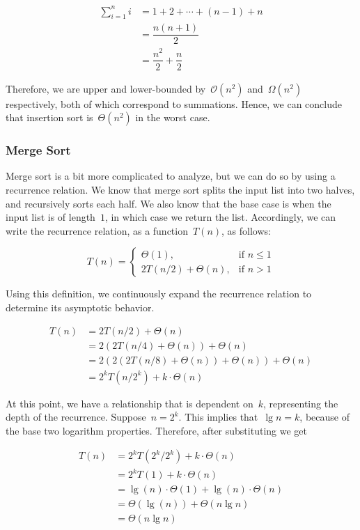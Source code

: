 \begin{align*}
  \sum_{i=1}^{n}i &= 1 + 2 + \cdots + (n - 1) + n\\
  &= \dfrac{n(n + 1)}{2}\\
  &= \dfrac{n^2}{2} + \dfrac{n}{2}
\end{align*}

Therefore, we are upper and lower-bounded by~$\mathcal{O}(n^2)$ and~$\Omega(n^2)$ respectively, both of which correspond to summations.
Hence, we can conclude that insertion sort is~$\Theta(n^2)$ in the worst case.

\subsubsection*{Merge Sort}
Merge sort is a bit more complicated to analyze, but we can do so by using a recurrence relation. 
We know that merge sort splits the input list into two halves, and recursively sorts each half. 
We also know that the base case is when the input list is of length~$1$, in which case we return the list. 
Accordingly, we can write the recurrence relation, as a function~$T(n)$, as follows:

\[
T(n)=
  \begin{cases}
    \Theta(1), & \text{if } n \leq 1\\
    2T(n/2) + \Theta(n), & \text{if } n > 1
  \end{cases}
\]

Using this definition, we continuously expand the recurrence relation to determine its asymptotic behavior.

\begin{align*}
  T(n) &= 2T(n/2) + \Theta(n)\\
       &= 2(2T(n/4) + \Theta(n)) + \Theta(n)\\
       &= 2(2(2T(n/8) + \Theta(n)) + \Theta(n)) + \Theta(n)\\
       &= 2^kT(n/2^k) + k\cdot\Theta(n)
\end{align*}

At this point, we have a relationship that is dependent on~$k$, representing the depth of the recurrence. 
Suppose~$n=2^k$. 
This implies that~$\lg{n} = k$, because of the base two logarithm properties. 
Therefore, after substituting we get

\begin{align*}
  T(n) &= 2^kT(2^k/2^k) + k\cdot\Theta(n)\\
       &= 2^kT(1) + k\cdot\Theta(n)\\
       &= \lg(n)\cdot\Theta(1) + \lg(n)\cdot \Theta(n)\\
       &= \Theta{(\lg(n))} + \Theta{(n \lg n)}\\
       &= \Theta{(n \lg n)} 
\end{align*}

